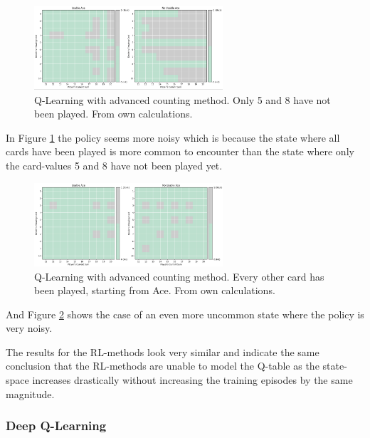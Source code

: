 \documentclass[conference]{IEEEtran}
\begin{document}
\begin{figure}
	\centering
	\includegraphics[width=70mm]{figures/Q-Learning/advanced-counting-10-million/policy-5-8-not-played.png}
	\caption{Q-Learning with advanced counting method. Only 5 and 8 have not been played. From own calculations.}
	\label{fig:q-learning-advanced-5-8-not-played}
\end{figure}

In Figure \ref{fig:q-learning-advanced-5-8-not-played} the policy seems more noisy which is because the state where all cards have been played is more common to encounter than the state where only the card-values 5 and 8 have not been played yet. 

\begin{figure}
	\centering
	\includegraphics[width=70mm]{figures/Q-Learning/advanced-counting-10-million/policy-some-cards-played-1010101010.png}
	\caption{Q-Learning with advanced counting method. Every other card has been played, starting from Ace. From own calculations.}
	\label{fig:q-learning-advanced-every-other}
\end{figure}

And Figure \ref{fig:q-learning-advanced-every-other} shows the case of an even more uncommon state where the policy is very noisy.  

The results for the RL-methods look very similar and indicate the same conclusion that the RL-methods are unable to model the Q-table as the state-space increases drastically without increasing the training episodes by the same magnitude. 

\subsubsection{Deep Q-Learning}
\end{document}
